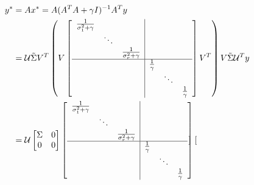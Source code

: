 
\begin{align*}
y^* &= Ax^* = A(A^TA + \gamma I)^{-1}A^Ty\\
&= \mathcal{U}\tilde{\Sigma}V^T\left(V
\left[
\begin{array}{c|c}
\begin{matrix}
\frac{1}{\sigma_1^2+\gamma} & &\\
&\ddots&\\
&&\frac{1}{\sigma_r^2+\gamma}
\end{matrix}&  \\ \hline 
& \begin{matrix}
\frac{1}{\gamma} & &\\
&\ddots&\\
&&\frac{1}{\gamma}
\end{matrix}
\end{array}
\right]
V^T\right)V\tilde{\Sigma}\mathcal{U}^Ty\\
&= \mathcal{U}
\begin{bmatrix}
\Sigma & 0\\
0 & 0
\end{bmatrix}
\left[
\begin{array}{c|c}
\begin{matrix}
\frac{1}{\sigma_1^2+\gamma} & &\\
&\ddots&\\
&&\frac{1}{\sigma_r^2+\gamma}
\end{matrix}&  \\ \hline 
& \begin{matrix}
\frac{1}{\gamma} & &\\
&\ddots&\\
&&\frac{1}{\gamma}
\end{matrix}
\end{array}
\right]
\begin{bmatrix}

\end{bmatrix}
\end{align*}
